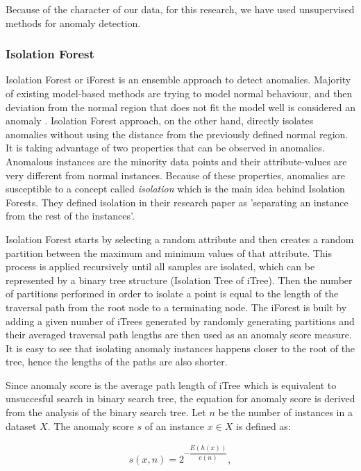  Because of the character of our data, for this research, we have used unsupervised methods for anomaly detection.
 
 \subsubsection{Isolation Forest}
 \label{section:lrIsolationForest}
 Isolation Forest or iForest \cite{liu2012isolation} is an ensemble approach to detect anomalies. Majority of existing model-based methods are trying to model normal behaviour, and then deviation from the normal region that does not fit the model well is considered an anomaly \cite{introToDataMining2005}. Isolation Forest approach, on the other hand, directly isolates anomalies without using the distance from the previously defined normal region. It is taking advantage of two properties that can be observed in anomalies. Anomalous instances are the minority data points and their attribute-values are very different from normal instances. Because of these properties, anomalies are susceptible to a concept called \textit{isolation} which is the main idea behind Isolation Forests. They defined isolation in their research paper as 'separating an instance from the rest of the instances'.
 
 Isolation Forest starts by selecting a random attribute and then creates a random partition between the maximum and minimum values of that attribute. This process is applied recursively until all samples are isolated, which can be represented by a binary tree structure (Isolation Tree of iTree). Then the number of partitions performed in order to isolate a point is equal to the length of the traversal path from the root node to a terminating node. The iForest is built by adding a given number of iTrees generated by randomly generating partitions and their averaged traversal path lengths are then used as an anomaly score measure. It is easy to see that isolating anomaly instances happens closer to the root of the tree, hence the lengths of the paths are also shorter.
 
 Since anomaly score is the average path length of iTree which is equivalent to unsuccesful search in binary search tree, the equation for anomaly score is derived from the analysis of the binary search tree.  Let $n$ be the number of instances in a dataset $X$. The anomaly score $s$ of an instance $x \in X$ is defined as: 
 
 \begin{gather}
     s(x, n) = 2^{- \dfrac{E(h(x))}{c(n)}},
 \end{gather}
 
